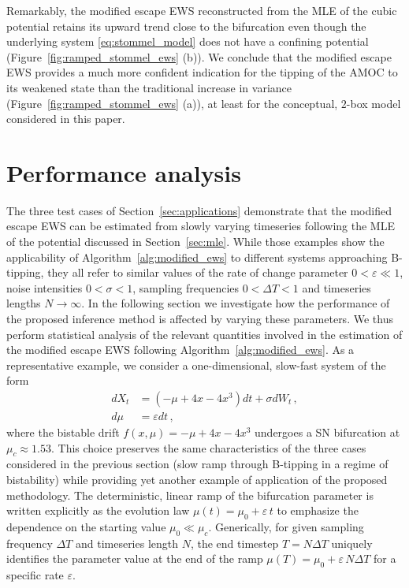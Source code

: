 \documentclass[a4paper,fleqn]{cas-sc}
\newcommand{\sref}[1]{Section~\ref{#1}}
\newcommand{\fref}[1]{Figure~\ref{#1}}
\begin{document}
Remarkably, the modified escape EWS reconstructed from the MLE of the cubic potential retains its upward trend close to the bifurcation even though the underlying system \eqref{eq:stommel_model} does not have a confining potential (\fref{fig:ramped_stommel_ews} (b)).
We conclude that the modified escape EWS provides a much more confident indication for the tipping of the AMOC to its weakened state than the traditional increase in variance (\fref{fig:ramped_stommel_ews} (a)), at least for the conceptual, $2$-box model considered in this paper.
%
\section{Performance analysis}\label{sec:analysis}
The three test cases of \sref{sec:applications} demonstrate that the modified escape EWS can be estimated from slowly varying timeseries following the MLE of the potential discussed in \sref{sec:mle}.
While those examples show the applicability of Algorithm~\ref{alg:modified_ews} to different systems approaching B-tipping, they all refer to similar values of the rate of change parameter $0<\varepsilon\ll1$, noise intensities $0<\sigma<1$, sampling frequencies $0<\Delta T<1$ and timeseries lengths $N\to\infty$.
In the following section we investigate how the performance of the proposed inference method is affected by varying these parameters.
We thus perform statistical analysis of the relevant quantities involved in the estimation of the modified escape EWS following Algorithm~\ref{alg:modified_ews}.
As a representative example, we consider a one-dimensional, slow-fast system of the form
%
\begin{equation}
        \begin{aligned}\label{eq:bistable_model}
                dX_t &= (-\mu + 4x - 4x^3)dt + \sigma dW_t\,,\\ 
                d\mu &= \varepsilon dt\,,
        \end{aligned}
\end{equation}
%
where the bistable drift $f(x,\mu)= -\mu + 4x - 4x^3$ undergoes a SN bifurcation at $\mu_c\approx1.53$.
This choice preserves the same characteristics of the three cases considered in the previous section (slow ramp through B-tipping in a regime of bistability) while providing yet another example of application of the proposed methodology.
The deterministic, linear ramp of the bifurcation parameter is written explicitly as the evolution law $\mu(t) = \mu_0 + \varepsilon\,t$ to emphasize the dependence on the starting value $\mu_0 \ll \mu_c$.
Generically, for given sampling frequency $\Delta T$ and timeseries length $N$, the end timestep $T=N\Delta T$ uniquely identifies the parameter value at the end of the ramp $\mu(T)=\mu_0+\varepsilon\,N\Delta T$ for a specific rate $\varepsilon$. 
%
\end{document}
